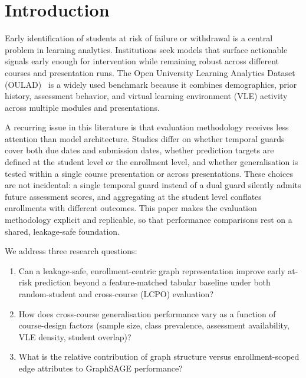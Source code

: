\documentclass[sigconf,review]{acmart}
\begin{document}
\section{Introduction}
\label{sec:intro}

Early identification of students at risk of failure or withdrawal is a
central problem in learning analytics.  Institutions seek models that
surface actionable signals early enough for intervention while remaining
robust across different courses and presentation runs.  The Open University
Learning Analytics Dataset (OULAD)~\cite{kuzilek2017oulad} is a widely used
benchmark because it combines demographics, prior history, assessment
behavior, and virtual learning environment (VLE) activity across multiple
modules and presentations.

A recurring issue in this literature is that evaluation methodology receives
less attention than model architecture.  Studies differ on whether temporal
guards cover both due dates and submission dates, whether prediction targets
are defined at the student level or the enrollment level, and whether
generalisation is tested within a single course presentation or across
presentations.  These choices are not incidental: a single temporal guard
instead of a dual guard silently admits future assessment scores, and
aggregating at the student level conflates enrollments with different
outcomes.  This paper makes the evaluation methodology explicit and
replicable, so that performance comparisons rest on a shared, leakage-safe
foundation.

We address three research questions:
\begin{enumerate}
  \item[\textbf{RQ1}]  Can a leakage-safe, enrollment-centric graph
        representation improve early at-risk prediction beyond a
        feature-matched tabular baseline under both random-student and
        cross-course (LCPO) evaluation?
  \item[\textbf{RQ2}]  How does cross-course generalisation performance vary
        as a function of course-design factors (sample size, class
        prevalence, assessment availability, VLE density, student overlap)?
  \item[\textbf{RQ3}]  What is the relative contribution of graph structure
        versus enrollment-scoped edge attributes to GraphSAGE performance?
\end{enumerate}
\end{document}
